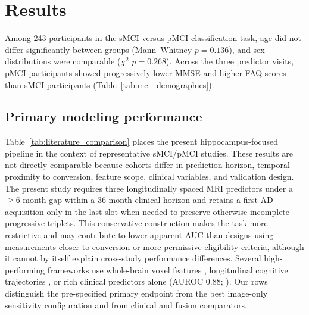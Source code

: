 \documentclass[review]{elsarticle}
\begin{document}
	
	\section{Results}
	\label{sec:Results}
	
	Among 243 participants in the sMCI versus pMCI classification task, age did not differ significantly between groups (Mann--Whitney $p=0.136$), and sex distributions were comparable ($\chi^2$ $p=0.268$). Across the three predictor visits, pMCI participants showed progressively lower MMSE and higher FAQ scores than sMCI participants (Table~\ref{tab:mci_demographics}).
	
	\subsection{Primary modeling performance}
	
	Table~\ref{tab:literature_comparison} places the present hippocampus-focused pipeline in the context of representative sMCI/pMCI studies. These results are not directly comparable because cohorts differ in prediction horizon, temporal proximity to conversion, feature scope, clinical variables, and validation design. The present study requires three longitudinally spaced MRI predictors under a $\geq6$-month gap within a 36-month clinical horizon and retains a first AD acquisition only in the last slot when needed to preserve otherwise incomplete progressive triplets. This conservative construction makes the task more restrictive and may contribute to lower apparent AUC than designs using measurements closer to conversion or more permissive eligibility criteria, although it cannot by itself explain cross-study performance differences. Several high-performing frameworks use whole-brain voxel features \citep{moradi-2015,ye-2012}, longitudinal cognitive trajectories \citep{bucholc-2023}, or rich clinical predictors alone (AUROC 0.88; \citealp{grassi-2019}). Our rows distinguish the pre-specified primary endpoint from the best image-only sensitivity configuration and from clinical and fusion comparators.
	
\end{document}

